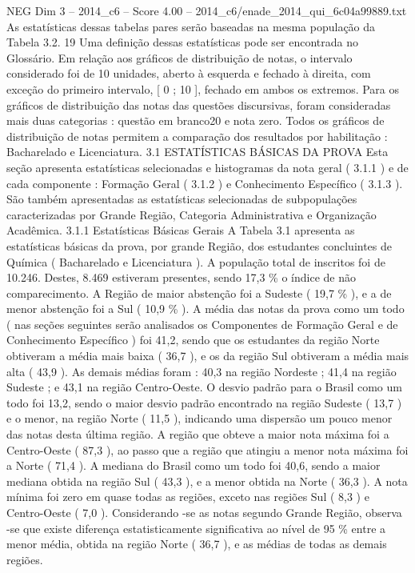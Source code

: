 \begin{textsample}{NEG Dim 3 – 2014\_c6 – Score 4.00 – 2014\_c6/enade\_2014\_qui\_6c04a99889.txt}
As estatísticas dessas tabelas pares serão baseadas na mesma população da Tabela 3.2. 19 Uma definição dessas estatísticas pode ser encontrada no Glossário.
Em relação aos gráficos de distribuição de notas, o intervalo considerado foi de 10 unidades, aberto à esquerda e fechado à direita, com exceção do primeiro intervalo, [ 0 ; 10 ], fechado em ambos os extremos.
Para os gráficos de distribuição das notas das questões discursivas, foram consideradas mais duas categorias : questão em branco20 e nota zero.
Todos os gráficos de distribuição de notas permitem a comparação dos resultados por habilitação : Bacharelado e Licenciatura. 3.1 ESTATÍSTICAS BÁSICAS DA PROVA Esta seção apresenta estatísticas selecionadas e histogramas da nota geral ( 3.1.1 ) e de cada componente : Formação Geral ( 3.1.2 ) e Conhecimento Específico ( 3.1.3 ).
São também apresentadas as estatísticas selecionadas de subpopulações caracterizadas por Grande Região, Categoria Administrativa e Organização Acadêmica. 3.1.1 Estatísticas Básicas Gerais A Tabela 3.1 apresenta as estatísticas básicas da prova, por grande Região, dos estudantes concluintes de Química ( Bacharelado e Licenciatura ).
A população total de inscritos foi de 10.246.
Destes, 8.469 estiveram presentes, sendo 17,3 \% o índice de não comparecimento.
A Região de maior abstenção foi a Sudeste ( 19,7 \% ), e a de menor abstenção foi a Sul ( 10,9 \% ).
A média das notas da prova como um todo ( nas seções seguintes serão analisados os Componentes de Formação Geral e de Conhecimento Específico ) foi 41,2, sendo que os estudantes da região Norte obtiveram a média mais baixa ( 36,7 ), e os da região Sul obtiveram a média mais alta ( 43,9 ).
As demais médias foram : 40,3 na região Nordeste ; 41,4 na região Sudeste ; e 43,1 na região Centro-Oeste.
O desvio padrão para o Brasil como um todo foi 13,2, sendo o maior desvio padrão encontrado na região Sudeste ( 13,7 ) e o menor, na região Norte ( 11,5 ), indicando uma dispersão um pouco menor das notas desta última região.
A região que obteve a maior nota máxima foi a Centro-Oeste ( 87,3 ), ao passo que a região que atingiu a menor nota máxima foi a Norte ( 71,4 ).
A mediana do Brasil como um todo foi 40,6, sendo a maior mediana obtida na região Sul ( 43,3 ), e a menor obtida na Norte ( 36,3 ).
A nota mínima foi zero em quase todas as regiões, exceto nas regiões Sul ( 8,3 ) e Centro-Oeste ( 7,0 ).
Considerando -se as notas segundo Grande Região, observa -se que existe diferença estatisticamente significativa ao nível de 95 \% entre a menor média, obtida na região Norte ( 36,7 ), e as médias de todas as demais regiões.

\end{textsample}
